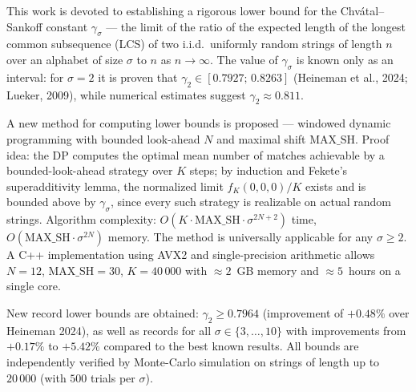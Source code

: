 This work is devoted to establishing a rigorous lower bound for the Chv\'atal--Sankoff constant $\gamma_\sigma$ --- the limit of the ratio of the expected length of the longest common subsequence (LCS) of two i.i.d.\ uniformly random strings of length $n$ over an alphabet of size $\sigma$ to $n$ as $n \to \infty$. The value of $\gamma_\sigma$ is known only as an interval: for $\sigma = 2$ it is proven that $\gamma_2 \in [0.7927;\, 0.8263]$ (Heineman et al., 2024; Lueker, 2009), while numerical estimates suggest $\gamma_2 \approx 0.811$.

A new method for computing lower bounds is proposed --- windowed dynamic programming with bounded look-ahead $N$ and maximal shift $\mathrm{MAX\_SH}$. Proof idea: the DP computes the optimal mean number of matches achievable by a bounded-look-ahead strategy over $K$ steps; by induction and Fekete's superadditivity lemma, the normalized limit $f_K(0,0,0)/K$ exists and is bounded above by $\gamma_\sigma$, since every such strategy is realizable on actual random strings. Algorithm complexity: $O(K \cdot \mathrm{MAX\_SH} \cdot \sigma^{2N+2})$ time, $O(\mathrm{MAX\_SH} \cdot \sigma^{2N})$ memory. The method is universally applicable for any $\sigma \geq 2$. A C++ implementation using AVX2 and single-precision arithmetic allows $N = 12$, $\mathrm{MAX\_SH} = 30$, $K = 40\,000$ with $\approx 2$~GB memory and $\approx 5$~hours on a single core.

New record lower bounds are obtained: $\gamma_2 \geq 0.7964$ (improvement of $+0.48\%$ over Heineman 2024), as well as records for all $\sigma \in \{3, \ldots, 10\}$ with improvements from $+0.17\%$ to $+5.42\%$ compared to the best known results. All bounds are independently verified by Monte-Carlo simulation on strings of length up to $20\,000$ (with $500$ trials per $\sigma$).
